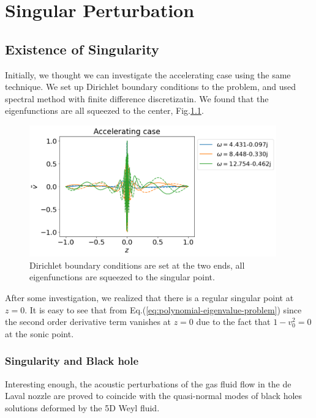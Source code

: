 \chapter{Singular Perturbation}
\section{Existence of Singularity}
Initially, we thought we can investigate the accelerating case using the same technique. We set up Dirichlet boundary conditions to the problem, and used spectral method with finite difference discretizatin. We found that the eigenfunctions are all squeezed to the center, Fig.\ref{fig:bad-accelerating-v}.
\begin{figure}[htbp]
  \begin{center}
    \includegraphics[width=0.95\textwidth]{figures/results-bad-accelerating-v.png}
  \end{center}
  \caption{Dirichlet boundary conditions are set at the two ends, all eigenfunctions are squeezed to the singular point.}
  \label{fig:bad-accelerating-v}
\end{figure}


After some investigation, we realized that there is a regular singular point at $z=0$. It is easy to see that from Eq.(\ref{eq:polynomial-eigenvalue-problem}) since the second order derivative term vanishes at $z=0$ due to the fact that $1-v_0^2=0$ at the sonic point.

\subsection{Singularity and Black hole}
Interesting enough, the acoustic perturbations of the gas fluid flow in the de Laval nozzle are proved to coincide with the quasi-normal modes of black holes solutions deformed by the 5D Weyl fluid. \cite{da_rocha_black_2017, furuhashi_simulation_2006} 

